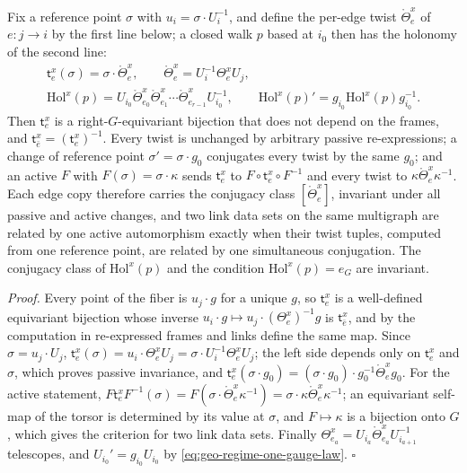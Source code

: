 Fix a reference point $\sigma$ with $u_i=\sigma\cdot U_i^{-1}$, and define the per-edge twist
$\mathring\Theta_e^x$ of $e:j\to i$ by the first line below; a closed walk $p$ based at $i_0$ then has
the holonomy of the second line:
\begin{gather}
\mathsf t_e^x(\sigma)=\sigma\cdot\mathring\Theta_e^x,
\qquad
\mathring\Theta_e^x=U_i^{-1}\Theta_e^xU_j,
\label{eq:geo-edge-twist}\\
\mathrm{Hol}^x(p)=U_{i_0}\mathring\Theta_{e_0}^x\mathring\Theta_{e_1}^x\cdots\mathring\Theta_{e_{r-1}}^xU_{i_0}^{-1},
\qquad
\mathrm{Hol}^x(p)'=g_{i_0}\mathrm{Hol}^x(p)g_{i_0}^{-1}.
\label{eq:geo-edge-twist-holonomy}
\end{gather}
Then $\mathsf t_e^x$ is a right-$G$-equivariant bijection that does not depend on the frames, and
$\mathsf t_{\bar e}^x=(\mathsf t_e^x)^{-1}$. Every twist is unchanged by arbitrary passive
re-expressions; a change of reference point $\sigma'=\sigma\cdot g_0$ conjugates every twist by the
same $g_0$; and an active $F$ with $F(\sigma)=\sigma\cdot\kappa$ sends $\mathsf t_e^x$ to
$F\circ\mathsf t_e^x\circ F^{-1}$ and every twist to $\kappa\mathring\Theta_e^x\kappa^{-1}$. Each edge
copy therefore carries the conjugacy class $[\mathring\Theta_e^x]$, invariant under all passive and
active changes, and two link data sets on the same multigraph are related by one active
automorphism exactly when their twist tuples, computed from one reference point, are related by one
simultaneous conjugation. The conjugacy class of $\mathrm{Hol}^x(p)$ and the condition
$\mathrm{Hol}^x(p)=e_G$ are invariant. 

\noindent\emph{Proof.}
Every point of the fiber is $u_j\cdot g$ for a unique $g$, so $\mathsf t_e^x$ is a well-defined
equivariant bijection whose inverse $u_i\cdot g\mapsto u_j\cdot(\Theta_e^x)^{-1}g$ is $\mathsf t_{\bar e}^x$,
and by the computation in  re-expressed frames and links define the same
map. Since $\sigma=u_j\cdot U_j$, $\mathsf t_e^x(\sigma)=u_i\cdot\Theta_e^xU_j=\sigma\cdot
U_i^{-1}\Theta_e^xU_j$; the left side depends only on $\mathsf t_e^x$ and $\sigma$, which proves passive
invariance, and $\mathsf t_e^x(\sigma\cdot g_0)=(\sigma\cdot g_0)\cdot g_0^{-1}\mathring\Theta_e^xg_0$.
For the active statement,
$F\mathsf t_e^xF^{-1}(\sigma)=F(\sigma\cdot\mathring\Theta_e^x\kappa^{-1})=\sigma\cdot\kappa\mathring\Theta_e^x\kappa^{-1}$;
an equivariant self-map of the torsor is determined by its value at $\sigma$, and $F\mapsto\kappa$ is a
bijection onto $G$, which gives the criterion for two link data sets. Finally
$\Theta_{e_a}^x=U_{i_a}\mathring\Theta_{e_a}^xU_{i_{a+1}}^{-1}$ telescopes, and $U_{i_0}'=g_{i_0}U_{i_0}$ by
\eqref{eq:geo-regime-one-gauge-law}. \hfill$\square$

